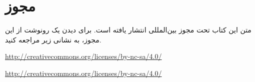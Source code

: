 \section*{مجوز}
متن این کتاب تحت مجوز بین‌المللی {} انتشار یافته است. برای دیدن یک رونوشت از این مجوز، به نشانی زیر مراجعه کنید.

\begin{LTR}
\url{http://creativecommons.org/licenses/by-nc-sa/4.0/}
\end{LTR}
\vspace{1cm}
\begin{LTR}

\url{http://creativecommons.org/licenses/by-nc-sa/4.0/}
\end{LTR}
\vfill
\newpage
